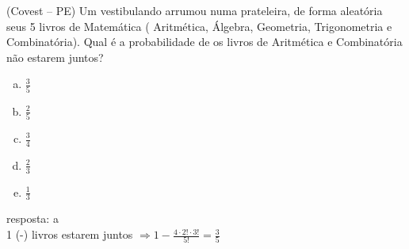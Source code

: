 \begin{ex}
 (Covest – PE) Um vestibulando arrumou numa prateleira, de forma aleatória seus 5 livros de Matemática ( Aritmética, Álgebra, Geometria, Trigonometria e Combinatória). Qual é a probabilidade de os livros de Aritmética e Combinatória não estarem juntos?
   \begin{enumerate}[(a)]
   \item $\frac{3}{5}$
   \item $\frac{2}{5}$
   \item $\frac{3}{4}$
   \item $\frac{2}{3}$
   \item $\frac{1}{3}$
   \end{enumerate}
    \begin{sol}
      resposta: a \\
      1 (-) livros estarem juntos 
      $ \Longrightarrow 1-\frac{4\cdot2!\cdot3!}{5!}=\frac{3}{5}$
    \end{sol}
\end{ex}